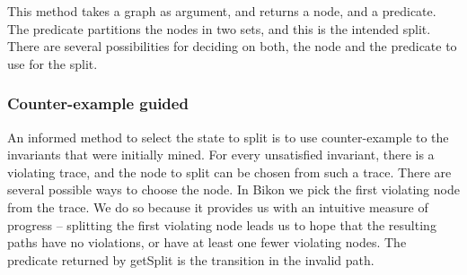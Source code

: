 This method takes a graph as argument, and returns a node, and a
predicate. The predicate partitions the nodes in two sets, and this is
the intended split. There are several possibilities for deciding on
both, the node and the predicate to use for the split.




\subsubsection{Counter-example guided}

An informed method to select the state to split is to use
counter-example to the invariants that were initially mined. For every
unsatisfied invariant, there is a violating trace, and the node to
split can be chosen from such a trace. There are several possible ways
to choose the node. In Bikon we pick the first violating node from the
trace. We do so because it provides us with an intuitive measure of
progress -- splitting the first violating node leads us to hope that
the resulting paths have no violations, or have at least one fewer
violating nodes. The predicate returned by getSplit is the transition
in the invalid path.




